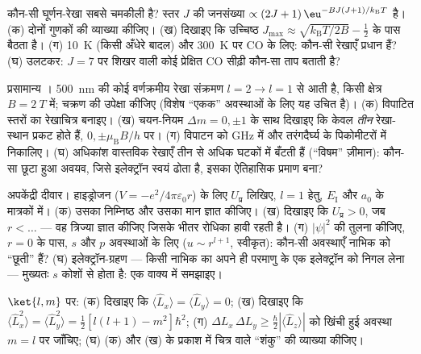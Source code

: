 \begin{exercise}[$\star\star$]\label{exo:b3:quantum-angular-momentum:6}
कौन-सी घूर्णन-रेखा सबसे चमकीली है? स्तर $J$ की जनसंख्या
$\propto (2J+1)\,\eu^{-BJ(J+1)/k_{\text{B}}T}$ है। (क) दोनों
गुणकों की व्याख्या कीजिए। (ख) दिखाइए कि उच्चिष्ठ $J_{\max} \approx
\sqrt{k_{\text{B}}T/2B} - \tfrac12$ के पास बैठता है। (ग) \qty{10}{K}
(किसी अँधेरे बादल) और \qty{300}{K} पर CO के लिए: कौन-सी रेखाएँ प्रधान
हैं? (घ) उलटकर: $J = 7$ पर शिखर वाली कोई प्रेक्षित CO सीढ़ी कौन-सा
ताप बताती है?
\end{exercise}

\begin{exercise}[$\star\star$]\label{exo:b3:quantum-angular-momentum:7}
प्रसामान्य । \qty{500}{nm} की कोई वर्णक्रमीय रेखा
संक्रमण $l = 2 \to l = 1$ से आती है, किसी क्षेत्र $B = \qty{2}{T}$ में;
चक्रण की उपेक्षा कीजिए (विशेष ``एकक'' अवस्थाओं के लिए यह उचित है)।
(क) विपाटित स्तरों का रेखाचित्र बनाइए। (ख) चयन-नियम $\Delta m = 0, \pm1$
के साथ दिखाइए कि केवल \emph{तीन} रेखा-स्थान प्रकट होते हैं, $0, \pm\mu_{\text{B}}B/h$ पर।
(ग) विपाटन को GHz में और तरंगदैर्घ्य के पिकोमीटरों में निकालिए।
(घ) अधिकांश वास्तविक रेखाएँ तीन से अधिक घटकों में बँटती हैं
(``विषम'' ज़ीमान): कौन-सा छूटा हुआ अवयव, जिसे इलेक्ट्रॉन स्वयं ढोता
है, इसका ऐतिहासिक प्रमाण बना?
\end{exercise}

\begin{exercise}[$\star\star$]\label{exo:b3:quantum-angular-momentum:8}
अपकेंद्री दीवार। हाइड्रोजन ($V = -e^2/4\pi\varepsilon_0r$) के लिए
$U_{\text{प्र}}$ लिखिए, $l = 1$ हेतु, $E_{\text{I}}$ और
$a_0$ के मात्रकों में। (क) उसका निम्निष्ठ और उसका मान ज्ञात
कीजिए। (ख) दिखाइए कि $U_{\text{प्र}} >
0$, जब $r < \dots$ --- वह त्रिज्या ज्ञात कीजिए जिसके भीतर रोधिका हावी रहती है। (ग)
$|\psi|^2$ की तुलना कीजिए, $r = 0$ के पास,
$s$ और $p$ अवस्थाओं के लिए ($u \sim r^{l+1}$, स्वीकृत): कौन-सी अवस्थाएँ नाभिक को
``छूती'' हैं? (घ) इलेक्ट्रॉन-ग्रहण --- किसी नाभिक का अपने ही परमाणु के
एक इलेक्ट्रॉन को निगल लेना --- मुख्यतः $s$ कोशों से होता है:
एक वाक्य में समझाइए।
\end{exercise}

\begin{exercise}[$\star\star$]\label{exo:b3:quantum-angular-momentum:9}
$\ket{l, m}$ पर: (क) दिखाइए कि $\langle\hat L_x\rangle = \langle\hat
L_y\rangle = 0$; (ख) दिखाइए कि $\langle\hat L_x^2\rangle = \langle\hat
L_y^2\rangle = \tfrac12[l(l+1) - m^2]\hbar^2$; (ग) 
$\Delta L_x\,\Delta L_y \ge \tfrac\hbar2
|\langle\hat L_z\rangle|$ को खिंची हुई अवस्था $m = l$ पर जाँचिए; (घ)
(क) और (ख) के प्रकाश में चित्र वाले ``शंकु'' की व्याख्या कीजिए।
\end{exercise}

